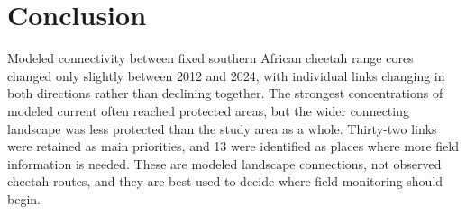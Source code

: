 \section{Conclusion}
\label{sec:conclusion}

Modeled connectivity between fixed southern African cheetah range cores changed only slightly between 2012 and 2024, with individual links changing in both directions rather than declining together. The strongest concentrations of modeled current often reached protected areas, but the wider connecting landscape was less protected than the study area as a whole. Thirty-two links were retained as main priorities, and 13 were identified as places where more field information is needed. These are modeled landscape connections, not observed cheetah routes, and they are best used to decide where field monitoring should begin.
